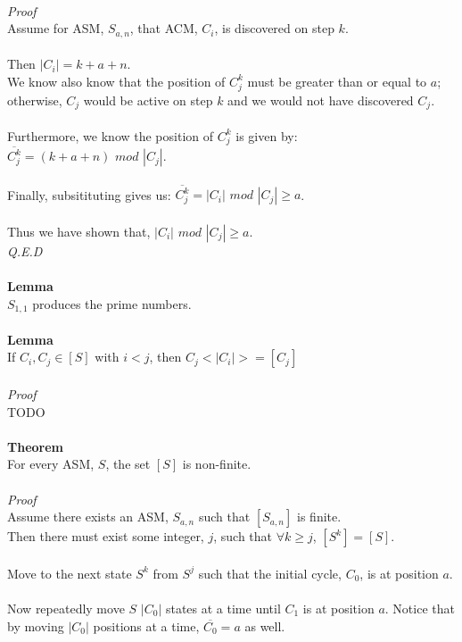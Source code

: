 \documentclass[a4paper,12pt]{article}
\begin{document}
\\
\textit{Proof}\\  
Assume for ASM, $S_{a,n}$, that ACM, $C_i$, is discovered on step $k$.\\
\\
Then $|C_i| = k + a + n$.\\
We know also know that the position of $C^k_j$ must be greater than or equal to $a$; otherwise, $C_j$ would be active on step $k$ and we would not have discovered $C_j$.\\
\\
Furthermore, we know the position of $C^k_j$ is given by:\\
$\overline{C^k_j} = (k + a + n)$ $mod$ $|C_j|$.\\ 
\\
Finally, subsitituting gives us: $\overline{C^k_j} = |C_i|$ $mod$ $|C_j| \geq a$.\\
\\
Thus we have shown that, $|C_i|$ $mod$ $|C_j| \geq a$.\\
\textit{Q.E.D}\\ 
\\
\textbf{Lemma}\\
$S_{1,1}$ produces the prime numbers.\\
\\
\textbf{Lemma}\\
If $C_i, C_j \in [S]$ with $i < j$, then $C_j<|C_i|> = [C_j]$\\
\\
\textit{Proof}\\  
TODO\\
\\
\textbf{Theorem}\\
For every ASM, $S$, the set $[S]$ is non-finite.\\
\\
\textit{Proof}\\  
Assume there exists an ASM, $S_{a,n}$ such that $[S_{a,n}]$ is finite.\\
Then there must exist some integer, $j$, such that $\forall k \geq j$, $[S^k] = [S]$.\\
\\
Move to the next state $S^k$ from $S^j$ such that the initial cycle, $C_0$, is at position $a$.\\
\\
Now repeatedly move $S$ $|C_0|$ states at a time until $C_1$ is at position $a$. Notice that by moving $|C_0|$ positions at a time, $\overline{C_0} = a$ as well.\\
\end{document}
